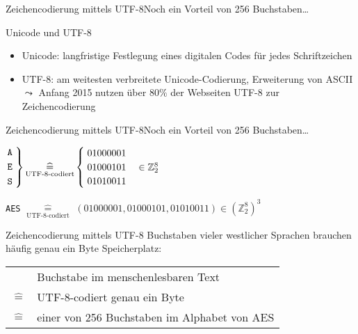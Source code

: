 \documentclass{beamer}
\newcommand{\Z}{\mathbb{Z}}
\theoremstyle{plain}
\begin{document}
\begin{frame}{Zeichencodierung mittels UTF-8}{Noch ein Vorteil von 256 Buchstaben\dots}
 
 \begin{block}{Unicode und UTF-8}
  \begin{itemize}
   \item Unicode: langfristige Festlegung eines digitalen Codes für jedes Schriftzeichen
   \item UTF-8: am weitesten verbreitete Unicode-Codierung, Erweiterung von ASCII\\
   $\leadsto$ Anfang 2015 nutzen über $80\%$ der Webseiten UTF-8 zur Zeichencodierung
  \end{itemize}
 \end{block}
 \begin{center}
 \end{center}
\end{frame}

\begin{frame}{Zeichencodierung mittels UTF-8}{Noch ein Vorteil von 256 Buchstaben\dots}
 \begin{center}
 $
 \begin{rcases*}
  \texttt A \;\\
  \texttt E \;\\
  \texttt S \;
 \end{rcases*} 
 \underset{\text{UTF-8-codiert}}{\widehat{=}}
 \begin{cases}
  \;01000001 \\
  \;01000101 \quad \in \Z_2^8\\
  \;01010011
 \end{cases}
 $
 \bigskip
 
 \texttt{AES} $\underset{\text{UTF-8-codiert}}{\widehat{=}}$ $(01000001, 01000101, 01010011) \in (\Z_2^8)^3$
 \end{center} \pause
 
 \begin{block}{Zeichencodierung mittels UTF-8}
  Buchstaben vieler westlicher Sprachen brauchen häufig genau ein Byte Speicherplatz:
  \begin{center}
  \begin{tabular}{cl}
 & Buchstabe im menschenlesbaren Text \\
 $\widehat{=}$ & UTF-8-codiert genau ein Byte \\
 $\widehat{=}$ & einer von 256 Buchstaben im Alphabet von AES 
 \end{tabular}
  \end{center}
 \end{block}
\end{frame}
\end{document}
